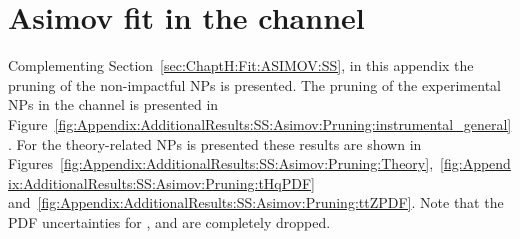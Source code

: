 \begin{comment}
\begin{figure}[h]
\centering
\begin{subfigure}{.5\textwidth}
  \centering
  \texttt{[image: Chapter5\_tHq/NPs/OS/Unblinded\_NormFactors\_statOnly]}
  \caption{Using only the statistical uncertainties.}
\end{subfigure}%
\begin{subfigure}{0.5\textwidth}
  \centering
  \texttt{[image: Chapter5\_tHq/NPs/OS/Unblinded\_NormFactors]}
  \caption{Considering all uncertainties.}
\end{subfigure}
\caption{Normalisation factors in the full-data-unblinded fit of the \dilepOStau channel.
 These results are obtained with (a) the fit considering only the statistical uncertainty and (b) the
considering all uncertainty sources.}
\label{fig:Appendix:AdditionalResults:OS:Unblinded:NormFactors}
\end{figure}

\FloatBarrier
\end{comment}


\section{Asimov fit in the \dilepSStau channel}
\label{sec:Appendix:AdditionalResults:SS:Asimov}
Complementing Section~\ref{sec:ChaptH:Fit:ASIMOV:SS}, in this appendix
the pruning of the non-impactful NPs is presented. %
The pruning of the experimental NPs in the \dilepSStau channel 
is presented in Figure~\ref{fig:Appendix:AdditionalResults:SS:Asimov:Pruning:instrumental_general}.
For the theory-related NPs is presented these results are shown in
Figures~\ref{fig:Appendix:AdditionalResults:SS:Asimov:Pruning:Theory},~\ref{fig:Appendix:AdditionalResults:SS:Asimov:Pruning:tHqPDF} 
and~\ref{fig:Appendix:AdditionalResults:SS:Asimov:Pruning:ttZPDF}. Note that the PDF uncertainties for \ttH, \ttbar and \ttW are completely dropped.

